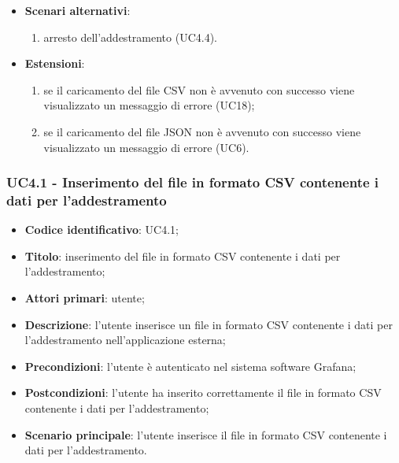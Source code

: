 \begin{itemize}
    \item \textbf{Scenari alternativi}:
    \begin{enumerate}
    	\item arresto dell'addestramento (UC4.4).
    \end{enumerate}
    \item \textbf{Estensioni}:
    \begin{enumerate}
    	\item se il caricamento del file CSV non è avvenuto con successo viene visualizzato un messaggio di errore (UC18);
    	\item se il caricamento del file JSON non è avvenuto con successo viene visualizzato un messaggio di errore (UC6).
    \end{enumerate}
\end{itemize}

\subsubsection{UC4.1 - Inserimento del file in formato CSV contenente i dati per l'addestramento}
\begin{itemize}
    \item \textbf{Codice identificativo}: UC4.1;
    \item \textbf{Titolo}: inserimento del file in formato CSV contenente i dati per l'addestramento;
    \item \textbf{Attori primari}: utente;
    \item \textbf{Descrizione}: l'utente inserisce un file in formato CSV contenente i dati per l'addestramento nell'applicazione esterna;
    \item \textbf{Precondizioni}: l'utente è autenticato nel sistema software Grafana\glo;
    \item \textbf{Postcondizioni}: l'utente ha inserito correttamente il file in formato CSV contenente i dati per l'addestramento;
    \item \textbf{Scenario principale}: l'utente inserisce il file in formato CSV contenente i dati per l'addestramento.
\end{itemize}
